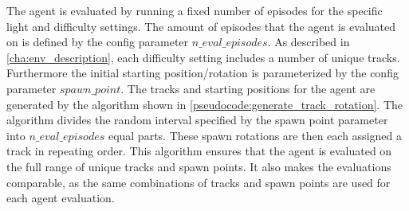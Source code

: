 \begin{table}
\begin{center}
\end{center}
\caption{Collected and aggregate success\_rate metrics}
\label{table:success_rates_system}
\end{table}


The agent is evaluated by running a fixed number of episodes for the specific light and difficulty settings. The amount of episodes that the agent is evaluated on is defined by the config parameter $n\_eval\_episodes$. As described in \ref{cha:env_description}, each difficulty setting includes a number of unique tracks. Furthermore the initial starting position/rotation is parameterized by the config parameter $spawn\_point$.
The tracks and starting positions for the agent are generated by the algorithm shown in \ref{pseudocode:generate_track_rotation}. The algorithm divides the random interval specified by the spawn point parameter into $n\_eval\_episodes$ equal parts. These spawn rotations are then each assigned a track in repeating order.
This algorithm ensures that the agent is evaluated on the full range of unique tracks and spawn points.
It also makes the evaluations comparable, as the same combinations of tracks and spawn points are used for each agent evaluation.







